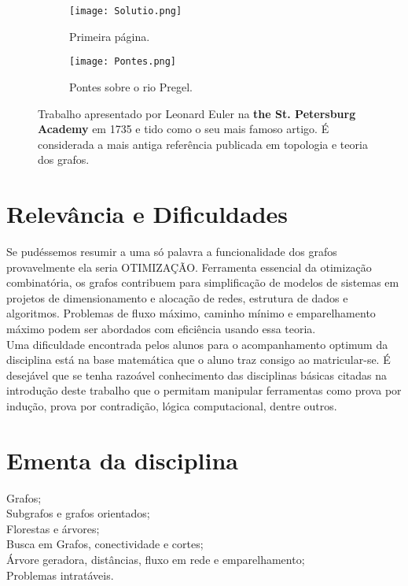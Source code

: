 \documentclass[10pt]{article}
\begin{document}
\begin{figure}[h]
 
\begin{subfigure}{0.5\textwidth}
\texttt{[image: Solutio.png]} 
\caption{Primeira página.}
\label{fig:subim1}
\end{subfigure}
\begin{subfigure}{0.5\textwidth}
\texttt{[image: Pontes.png]}
\caption{Pontes sobre o rio Pregel.}
\label{fig:subim2}
\end{subfigure}
 
\caption{Trabalho apresentado por Leonard Euler na \textbf{the St. Petersburg Academy} em 1735 e tido como o seu mais famoso artigo. É considerada a mais antiga referência publicada em topologia e teoria dos grafos. }
\label{fig:image2}
\end{figure}

\newpage
\section{Relevância e Dificuldades}
Se pudéssemos resumir a uma só palavra a funcionalidade dos grafos provavelmente ela seria OTIMIZAÇÃO. Ferramenta essencial da otimização combinatória, os grafos contribuem para simplificação de modelos de sistemas em projetos de dimensionamento e alocação de redes, estrutura de dados e algoritmos. Problemas de fluxo máximo, caminho mínimo e emparelhamento máximo podem ser abordados com eficiência usando essa teoria.\\

Uma dificuldade encontrada pelos alunos para o acompanhamento optimum da disciplina está na base matemática que o aluno traz consigo ao matricular-se. É desejável que se tenha razoável conhecimento das disciplinas básicas citadas na introdução deste trabalho que o permitam manipular ferramentas como prova por indução, prova por contradição, lógica computacional, dentre outros.

\section{Ementa da disciplina \cite{2} \cite{1} \cite{disciplina}}
Grafos;\\
Subgrafos e grafos orientados;\\
Florestas e árvores;\\
Busca em Grafos, conectividade e cortes;\\
Árvore geradora, distâncias, fluxo em rede e emparelhamento;\\
Problemas intratáveis.\\
\end{document}
